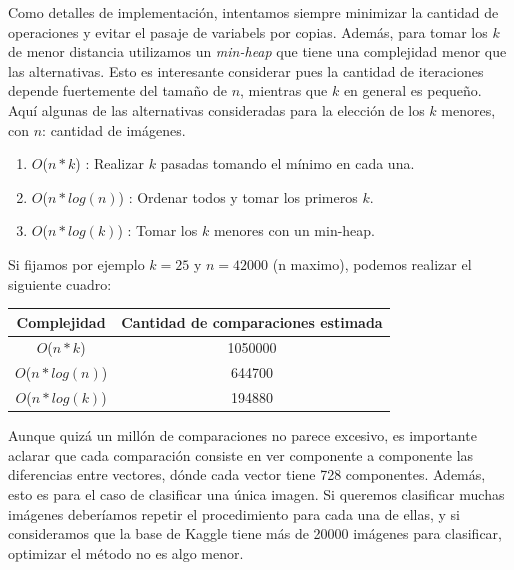 Como detalles de implementación, intentamos siempre minimizar la cantidad de operaciones y evitar el pasaje de variabels por copias. Además, para tomar los $k$ de menor distancia utilizamos un \textit{min-heap} que tiene una complejidad menor que las alternativas. Esto es interesante considerar pues la cantidad de iteraciones depende fuertemente del tamaño de $n$, mientras que $k$ en general es pequeño.\\

Aquí algunas de las alternativas consideradas para la elección de los $k$ menores, con $n$: cantidad de imágenes.

\begin{enumerate}
\item $O$($n * k$) : Realizar $k$ pasadas tomando el mínimo en cada una.
\item $O$($n * log(n)$) : Ordenar todos y tomar los primeros $k$.
\item $O$($n * log(k)$) : Tomar los $k$ menores con un min-heap.
\end{enumerate}

Si fijamos por ejemplo $k = 25$ y $n = 42000$ (n maximo), podemos realizar el siguiente cuadro:

\begin{center}
    \begin{tabular}{| c | c |}
    \hline
    Complejidad   &  Cantidad de comparaciones estimada \\ \hline

    $O$($n * k$)            & 1050000  \\ \hline
    $O$($n * log(n)$)       & 644700  \\ \hline
    $O$($n * log(k)$)       & 194880   \\ \hline
    \end{tabular}
\end{center}

Aunque quizá un millón de comparaciones no parece excesivo, es importante aclarar que cada comparación consiste en ver componente a componente las diferencias entre vectores, dónde cada vector tiene 728 componentes. Además, esto es para el caso de clasificar una única imagen. Si queremos clasificar muchas imágenes deberíamos repetir el procedimiento para cada una de ellas, y si consideramos que la base de Kaggle tiene más de 20000 imágenes para clasificar, optimizar el método no es algo menor. \\


